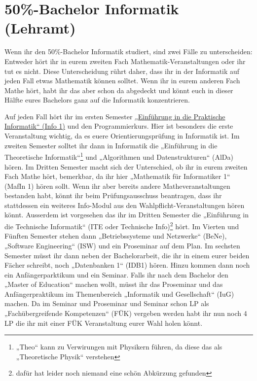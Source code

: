 \section{50\%-Bachelor Informatik (Lehramt)}

Wenn ihr den 50\%-Bachelor Informatik studiert, sind zwei Fälle zu
unterscheiden: Entweder hört ihr in eurem zweiten Fach
Ma\-the\-ma\-tik-Ver\-an\-stal\-tun\-gen oder ihr tut es nicht. Diese Unterscheidung rührt
daher, dass ihr in der Informatik auf jeden Fall etwas Mathematik können
solltet. Wenn ihr in eurem anderen Fach Mathe hört, habt ihr das aber schon da
abgedeckt und könnt euch in dieser Hälfte eures Bachelors ganz auf die
Informatik konzentrieren.

Auf jeden Fall hört ihr im ersten Semester \hyperref[info1]{„Einführung in die
Praktische Informatik“ (Info 1)} und den Programmierkurs. Hier ist besonders
die erste Veranstaltung wichtig, da es euere Orientierungsprüfung in Informatik
ist. Im zweiten Semester solltet ihr dann in Informatik die „Einführung in die
Theoretische Informatik“\footnote{„Theo“ kann zu Verwirungen mit Physikern
führen, da diese das als „Theoretische Physik“ verstehen} und „Algorithmen und
Datenstrukturen“ (AlDa) hören. Im Dritten Semester macht sich der Unterschied,
ob ihr in eurem zweiten Fach Mathe hört, bemerkbar, da ihr hier
„Mathematik für Informatiker 1“ (MafIn 1)  hören sollt.  Wenn ihr aber bereits
andere Matheveranstaltungen bestanden habt, könnt ihr beim Prüfungsausschuss
beantragen, dass ihr stattdessen ein weiteres Info-Modul aus den
Wahlpflicht-Veranstaltungen hören könnt.  Ausserdem ist vorgesehen das ihr im
Dritten Semester die „Einführung in die Technische Informatik“ (ITE oder
Technische Info)\footnote{dafür hat leider noch niemand eine schön Abkürzung
gefunden} hört.  Im Vierten und Fünften Semester stehen dann „Betriebssysteme
und Netzwerke“ (BeNe), „Software Engineering“ (ISW) und ein Proseminar auf dem
Plan. Im sechsten Semester müsst ihr dann neben der Bachelorarbeit, die ihr in
einem eurer beiden Fächer schreibt, noch „Datenbanken 1“ (IDB1) hören. Hinzu
kommen dann noch ein Anfängerparktikum und ein Seminar. Falls ihr nach dem
Bachelor den „Master of Education“ machen wollt, müsst ihr das Proseminar und
das Anfängerpraktikum im Themenbereich „Informatik und Gesellschaft“ (IuG)
machen.  Da im Seminar und Proseminar und Seminar schon \gls{LP} als
„Fachübergreifende Kompetenzen“ (FÜK) vergeben werden habt ihr nun noch 4
\gls{LP} die ihr mit einer FÜK Veranstaltung eurer Wahl holen könnt.

